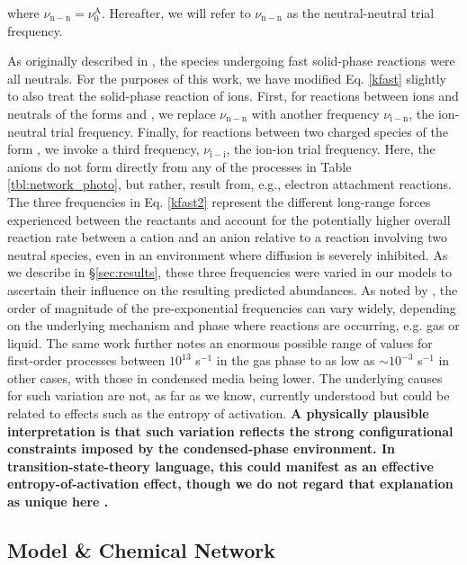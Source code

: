 \documentclass[journal=aesccq,manuscript=article,layout=twocolumn]{achemso}
\DeclareRobustCommand{\cb}[1]{\textbf{\textcolor{codexblue}{#1}}}
\begin{document}
\noindent
where $\nu_\mathrm{n-n} = \nu_0^\mathrm{A}$. Hereafter, we will refer to $\nu_\mathrm{n-n}$ as the neutral-neutral trial frequency.

As originally described in \citet{shingledecker_simulating_2019}, the species undergoing fast solid-phase reactions were all neutrals. For the purposes of this work, we have modified Eq. \eqref{kfast} slightly to also treat the solid-phase reaction of ions. First, for reactions between ions and neutrals of the forms  and , we replace $\nu_\mathrm{n-n}$ with another frequency $\nu_\mathrm{i-n}$, the ion-neutral trial frequency. Finally, for reactions between two charged species of the form , we invoke a third frequency, $\nu_\mathrm{i-i}$, the ion-ion trial frequency. Here, the anions do not form directly from any of the processes in Table \ref{tbl:network_photo}, but rather, result from, e.g., electron attachment reactions. The three frequencies in Eq. \eqref{kfast2} represent the different long-range forces experienced between the reactants and account for the potentially higher overall reaction rate between a cation and an anion relative to a reaction involving two neutral species, even in an environment where diffusion is severely inhibited. As we describe in \S\ref{sec:results}, these three frequencies were varied in our models to ascertain their influence on the resulting predicted abundances. As noted by \citet{theule_thermal_2013}, the order of magnitude of the pre-exponential frequencies can vary widely, depending on the underlying mechanism and phase where reactions are occurring, e.g. gas or liquid. The same work further notes an enormous possible range of values for first-order processes between $10^{13}$ s$^{-1}$ in the gas phase to as low as $\sim10^{-3}$ s$^{-1}$ in other cases, with those in condensed media being lower. The underlying causes for such variation are not, as far as we know, currently understood but could be related to effects such as the entropy of activation. \cb{A physically plausible interpretation is that such variation reflects the strong configurational constraints imposed by the condensed-phase environment. In transition-state-theory language, this could manifest as an effective entropy-of-activation effect, though we do not regard that explanation as unique here \citep{theule_thermal_2013}.}

\subsection{Model \& Chemical Network}
\end{document}
